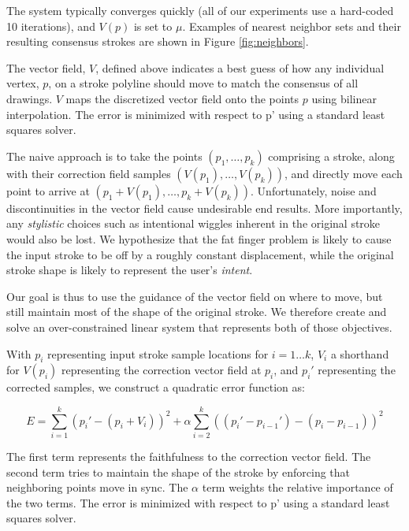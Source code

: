 The system typically converges quickly (all of our experiments use a hard-coded 10 iterations), and $V(p)$ is set to $\mu$.  Examples of nearest neighbor sets and their resulting consensus strokes are shown in Figure \ref{fig:neighbors}.






The vector field, $V$, defined above indicates a best guess of how any individual vertex, $p$, on a stroke polyline should move to match the consensus of all drawings. $V$ maps the discretized vector field onto the points $p$ using bilinear interpolation. The error is minimized with respect to p' using a standard least squares solver.

The naive approach is to take the points $(p_1, \ldots, p_k)$ comprising a stroke, along with their correction field samples $(V(p_1), \ldots, V(p_k))$, and directly move each point to arrive at $(p_1 + V(p_1), \ldots, p_k + V(p_k))$.  Unfortunately, noise and discontinuities in the vector field cause undesirable end results. More importantly, any {\em stylistic} choices such as intentional wiggles inherent in the original stroke would also be lost.  We hypothesize that the fat finger problem is likely to cause the input stroke to be off by a roughly constant displacement, while the original stroke shape is likely to represent the user's {\em intent}.

Our goal is thus to use the guidance of the vector field on where to move, but still maintain most of the shape of the original stroke.  We therefore create and solve an over-constrained linear system that represents both of those objectives.

With $p_i$ representing input stroke sample locations for $i=1\ldots k$, $V_i$ a shorthand for $V(p_i)$ representing the correction vector field at $p_i$, and $p_i'$ representing the corrected samples, we construct a quadratic error function as:

\begin{equation}
E =  \sum_{i=1}^k (p_i' - (p_i + V_i))^2 +  \alpha \sum_{i=2}^k ((p_i' - p_{i-1}') - (p_i - p_{i-1}))^2
\end{equation}

The first term represents the faithfulness to the correction vector field. The second term tries to maintain the shape of the stroke by enforcing that neighboring points move in sync. The $\alpha$ term weights the relative importance of the two terms. The error is minimized with respect to p' using a standard least squares solver.



